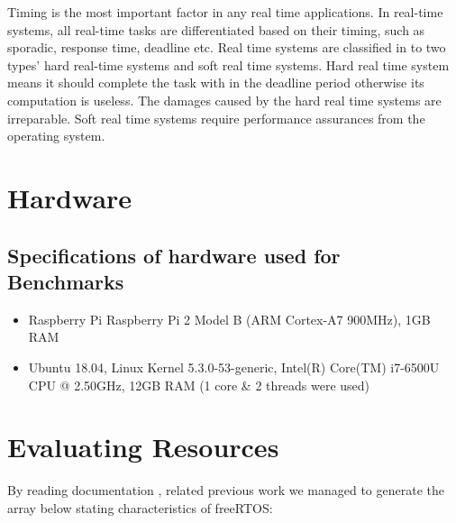 \documentclass[conference]{IEEEtran}
\begin{document}
Timing is the most important factor in any real time
applications. In real-time systems, all real-time tasks are differentiated
based on their timing, such as sporadic, response time,
deadline etc. Real time systems are classified in to two
types’ hard real-time systems and soft real time systems.
Hard real time system means it should complete the task
with in the deadline period otherwise its computation is
useless. The damages caused by the hard real time systems
are irreparable. 
Soft real time systems require
performance assurances from the operating system.

\section{Hardware}

\subsection{Specifications of hardware used for Benchmarks}

\begin{itemize}
    \item Raspberry Pi Raspberry Pi 2 Model B (ARM Cortex-A7 900MHz), 1GB RAM 
    \item Ubuntu 18.04, Linux Kernel 5.3.0-53-generic, Intel(R) Core(TM) i7-6500U CPU @ 2.50GHz, 12GB RAM (1 core \& 2 threads were used)
\end{itemize}


\section{Evaluating Resources}

By reading documentation \cite{b6}, related previous work \cite{b4} we managed to generate the array below stating characteristics of freeRTOS:
\end{document}

